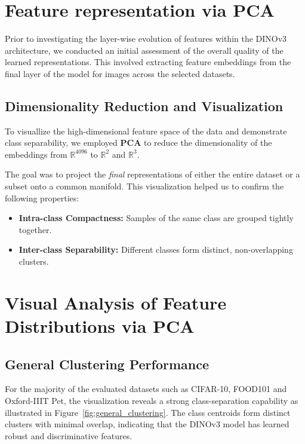 \documentclass[oneside]{ctuthesis}
\begin{document}
\section{Feature representation via PCA}
\label{sec:feature_representation_pca}
Prior to investigating the layer-wise evolution of features within the DINOv3 architecture, we conducted an initial assessment of the overall quality of the learned representations. This involved extracting feature embeddings from the final layer of the model for images across the selected datasets. 

\subsection{Dimensionality Reduction and Visualization}
To visuallize the high-dimensional feature space of the data and demonstrate class separability, we employed \textbf{PCA} to reduce the dimensionality of the embeddings from $\mathbb{R}^{4096}$ to $\mathbb{R}^2$ and $\mathbb{R}^3$.

The goal was to project the \textit{final} representations of either the entire dataset or a subset onto a common manifold. This visualization helped us to confirm the following properties:
\begin{itemize}
    \item \textbf{Intra-class Compactness:} Samples of the same class are grouped tightly together.
    \item \textbf{Inter-class Separability:} Different classes form distinct, non-overlapping clusters.
\end{itemize}

\section{Visual Analysis of Feature Distributions via PCA}
\label{sec:pca_feature_analysis}

\subsection{General Clustering Performance}
For the majority of the evaluated datasets such as CIFAR-10, FOOD101 and Oxford-IIIT Pet, the visualization reveals a strong class-separation capability as illustrated in Figure~\ref{fig:general_clustering}. The class centroids form distinct clusters with minimal overlap, indicating that the DINOv3 model has learned robust and discriminative features.
\end{document}
